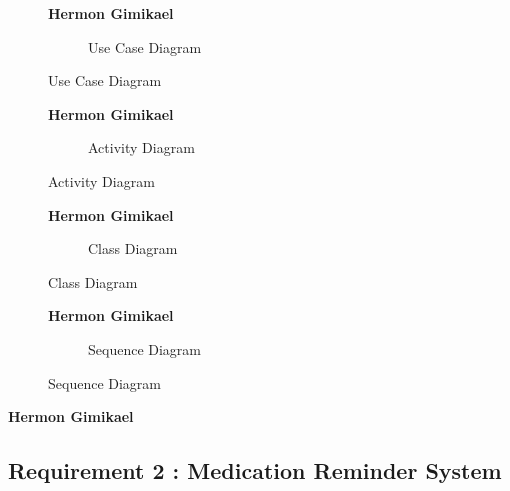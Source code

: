 \documentclass{article}
\begin{document}
\clearpage

\begin{figure}[htbp]
	\textbf{Hermon Gimikael}
    \centering
	\begin{subfigure}{\textwidth}
		\resizebox{\textwidth}{!}{}
		\caption{Use Case Diagram}
	\end{subfigure}
\end{figure}

\clearpage

\begin{figure}[htbp]
	\textbf{Hermon Gimikael}
	\centering
	\begin{subfigure}{\textwidth}
		\resizebox{\textwidth}{!}{}
		\caption{Activity Diagram}
	\end{subfigure}
\end{figure}

\clearpage

\begin{figure}[htbp]
	\textbf{Hermon Gimikael}
	\centering
	\begin{subfigure}{\textwidth}
		\resizebox{\textwidth}{!}{}
		\caption{Class Diagram}
	\end{subfigure}
\end{figure}

\clearpage

\begin{figure}[htbp]
	\textbf{Hermon Gimikael}
	\centering
	\begin{subfigure}{\textwidth}
		\resizebox{\textwidth}{!}{}
		\caption{Sequence Diagram}
	\end{subfigure}
\end{figure}


\clearpage

\textbf{Hermon Gimikael}
\subsection{Requirement 2 : Medication Reminder System}
\end{document}
